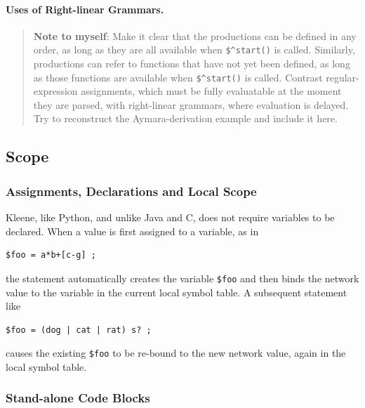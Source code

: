 \documentclass[letterpaper,12pt]{article}
\def\CPP{{C\nolinebreak[4]\hspace{-.08em}\raisebox{.3ex}{\footnotesize\bf
+}\nolinebreak\hspace{-.1em}\raisebox{.3ex}{\footnotesize\bf +}}}
\begin{document}
\paragraph{Uses of Right-linear Grammars.}

\begin{quote}
\textbf{Note to myself}:   Make it clear that the productions can be defined in any order, as long as they
are all available when \verb!$^start()! is called. Similarly,
productions can refer to functions that have not yet been defined,
as long as those functions are available when \verb!$^start()! is
called.  Contrast
regular-expression assignments, which must be fully evaluatable at the
moment they are parsed, with right-linear grammars, where
evaluation is delayed.
Try to reconstruct the Aymara-derivation example and include it here.  
\end{quote}



\subsection{Scope}

\subsubsection{Assignments, Declarations and Local Scope}

Kleene, like Python, and unlike Java and \CPP{}, does not require
variables to be declared.
When a value is first assigned to a variable, as in

\begin{Verbatim}[fontsize=\small]
$foo = a*b+[c-g] ;
\end{Verbatim}

\noindent
the statement automatically creates the variable \verb!$foo! and then binds
the network value to the variable in the current local symbol table.  A
subsequent statement like

\begin{Verbatim}[fontsize=\small]
$foo = (dog | cat | rat) s? ;
\end{Verbatim}

\noindent
causes the existing \verb!$foo! to be re-bound to the new network
value, again in the local symbol table.


\subsubsection{Stand-alone Code Blocks}
\end{document}
